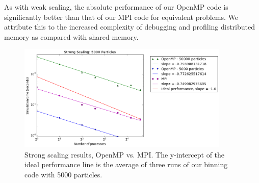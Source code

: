 \documentclass{article}
\begin{document}
As with weak scaling, the absolute performance of our OpenMP code is
significantly better than that of our MPI code for equivalent problems. We
attribute this to the increased complexity of debugging and profiling
distributed memory as compared with shared memory.
\begin{figure}[ht!]
\centering
\includegraphics[width=0.9\textwidth]{strong.png}
\caption{Strong scaling results, OpenMP vs. MPI. The y-intercept of
the ideal performance line is the average of three runs of our binning
code with 5000 particles.}\label{fig:strong}
\end{figure}
\clearpage


\end{document}
